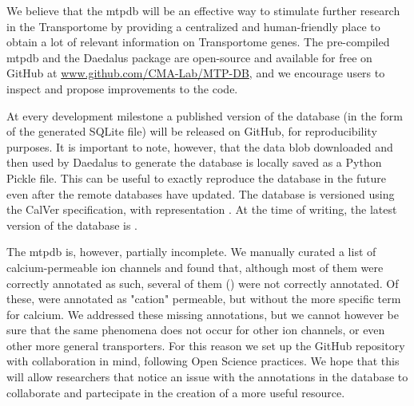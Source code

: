 We believe that the \gls{mtpdb} will be an effective way to stimulate further research in the Transportome by providing a centralized and human-friendly place to obtain a lot of relevant information on Transportome genes. The pre-compiled \gls{mtpdb} and the Daedalus package are open-source and available for free on GitHub at \href{https://github.com/CMA-Lab/MTP-DB/}{www.github.com/CMA-Lab/MTP-DB}, and we encourage users to inspect and propose improvements to the code.

At every development milestone a published version of the database (in the form of the generated SQLite file) will be released on GitHub, for reproducibility purposes. It is important to note, however, that the data blob downloaded and then used by Daedalus to generate the database is locally saved as a Python Pickle file. This can be useful to exactly reproduce the database in the future even after the remote databases have updated. The database is versioned using the CalVer specification, with representation . At the time of writing, the latest version of the database is .

The \gls{mtpdb} is, however, partially incomplete. We manually curated a list of  calcium-permeable ion channels and found that, although most of them were correctly annotated as such, several of them () were not correctly annotated. Of these,  were annotated as "cation" permeable, but without the more specific term for calcium. We addressed these missing annotations, but we cannot however be sure that the same phenomena does not occur for other ion channels, or even other more general transporters. For this reason we set up the GitHub repository with collaboration in mind, following Open Science practices. We hope that this will allow researchers that notice an issue with the annotations in the database to collaborate and partecipate in the creation of a more useful resource.




